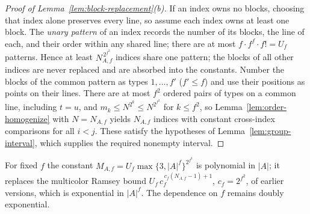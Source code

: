 \begin{proof}[Proof of Lemma~\ref{lem:block-replacement}(b)]
If an index owns no blocks, choosing that index alone preserves every
line, so assume each index owns at least one block. The
\emph{unary pattern} of an index records the number of its blocks, the
line of each, and their order within any shared line; there are at most
$f\cdot f^f\cdot f!=U_f$ patterns.  Hence at least $N_{A,f}^{\,2^{f^2}}$
indices share one pattern; the blocks of all other indices are never
replaced and are absorbed into the constants.  Number the blocks of the common
pattern as types $1,\ldots,f'$ ($f'\le f$) and use their positions as points
on their lines.  There are at most $f^2$ ordered pairs of types on a common
line, including $t=u$, and $m_k\le N^{2^k}\le N^{2^{f^2}}$ for $k\le f^2$, so
Lemma~\ref{lem:order-homogenize} with $N=N_{A,f}$ yields $N_{A,f}$ indices with
constant cross-index comparisons for all $i<j$.  These satisfy the hypotheses of
Lemma~\ref{lem:group-interval}, which supplies the required nonempty interval.
\end{proof}

For fixed $f$ the constant $M_{A,f}=U_f\max\{3,|A|^f\}^{2^{f^2}}$ is
polynomial in $|A|$; it replaces the multicolor Ramsey bound
$U_f\,c_f^{\,c_f(N_{A,f}-1)+1}$, $c_f=2^{f^2}$, of earlier versions, which is
exponential in $|A|^f$.  The dependence on $f$ remains doubly exponential.
